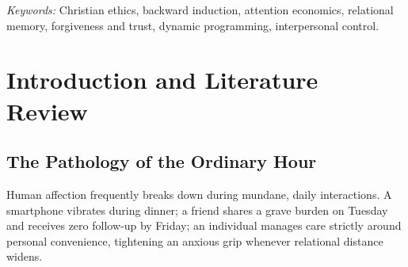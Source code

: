 \documentclass[11pt,twocolumn]{article}
\begin{document}
\begin{abstract}
Interpersonal relationships consistently fail in ordinary hours through distraction, cognitive forgetfulness, scorekeeping resentment, and anxious control. Conventional relationship frameworks model relational formation forward, encouraging individuals to exert increasing effort toward presence, communication, and emotional labor. This paper demonstrates that forward optimization generates moral hazard: individuals turn attention into a performance, memory into a surveillance ledger, and care into manipulative control. Applying Richard Bellman's principle of backward induction from dynamic programming and game theory, we construct a retrograde relational architecture that works backward from the terminal boundary condition. The system begins at Level 5 (Release: the open hand, renunciation of outcome control, and acceptance of human mess under God). It descends through Level 4 (Mercy and Trust with Edges: unilateral forgiveness paired with earned bilateral trust), Level 3 (Memory: structured cognitive retention and follow-up tools), and Level 2 (Time and Rest: cadence matching, space, and Sabbath play), arriving finally at Level 1 (Presence and Focused Attention: elimination of digital technoference). Integrating historical dogmatics from Dietrich Bonhoeffer, Thomas Aquinas, and Eastern Orthodox asceticism with contemporary cognitive neuroscience, this framework provides an operational, audited methodology for loving people with sustainable spiritual integrity.
\end{abstract}

\noindent\textit{Keywords:} Christian ethics, backward induction, attention economics, relational memory, forgiveness and trust, dynamic programming, interpersonal control.

\section{Introduction and Literature Review}

\subsection{The Pathology of the Ordinary Hour}
Human affection frequently breaks down during mundane, daily interactions. A smartphone vibrates during dinner; a friend shares a grave burden on Tuesday and receives zero follow-up by Friday; an individual manages care strictly around personal convenience, tightening an anxious grip whenever relational distance widens.
\end{document}
